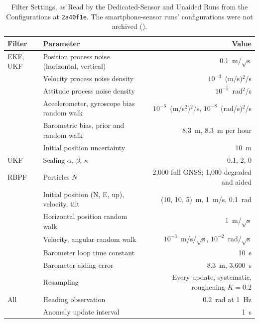 \begin{table}[htb]
  \caption{Filter Settings, as Read by the Dedicated-Sensor and Unaided Runs from the Configurations at \texttt{2a40f1e}. The smartphone-sensor runs' configurations were not archived ().}
  \label{tab:filter-settings}
  \centering
  \small
  \begin{tabular}{llr}
    \toprule
    Filter & Parameter & Value \\
    \midrule
    EKF, UKF & Position process noise (horizontal, vertical) & 0.1~m/\(\sqrt{\text{s}}\) \\
     & Velocity process noise density & \(10^{-3}\)~(m/s)\(^2\)/s \\
     & Attitude process noise density & \(10^{-5}\)~rad\(^2\)/s \\
     & Accelerometer, gyroscope bias random walk & \(10^{-6}\)~(m/s\(^2\))\(^2\)/s, \(10^{-8}\)~(rad/s)\(^2\)/s \\
     & Barometric bias, prior and random walk & 8.3~m, 8.3~m per hour \\
     & Initial position uncertainty & 10~m \\
    UKF & Scaling \(\alpha\), \(\beta\), \(\kappa\) & 0.1, 2, 0 \\
    \midrule
    RBPF & Particles \(N\) & 2{,}000 full GNSS; 1{,}000 degraded and aided \\
     & Initial position (N, E, up), velocity, tilt & (10, 10, 5)~m, 1~m/s, 0.1~rad \\
     & Horizontal position random walk & 1~m/\(\sqrt{\text{s}}\) \\
     & Velocity, angular random walk & \(10^{-3}\)~m/s/\(\sqrt{\text{s}}\), \(10^{-2}\)~rad/\(\sqrt{\text{s}}\) \\
     & Barometer loop time constant & 10~s \\
     & Barometer-aiding error & 8.3~m, 3{,}600~s \\
     & Resampling & Every update, systematic, roughening \(K = 0.2\) \\
    \midrule
    All & Heading observation & 0.2~rad at 1~Hz \\
     & Anomaly update interval & 1~s \\
    \bottomrule
  \end{tabular}
\end{table}
